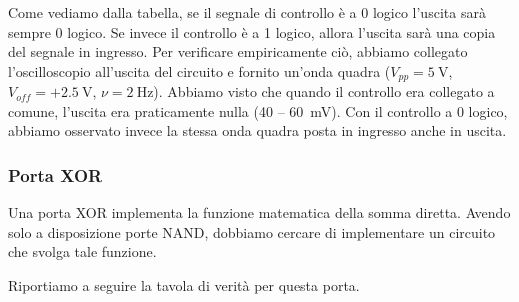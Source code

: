 Come vediamo dalla tabella, se il segnale di controllo è a 0 logico l'uscita sarà sempre 0 logico.
Se invece il controllo è a 1 logico, allora l'uscita sarà una copia del segnale in ingresso.
Per verificare empiricamente ciò, abbiamo collegato l'oscilloscopio all'uscita del circuito e fornito un'onda quadra ($V_{pp}=\SI{5}{\volt}$, $V_{off}=+\SI{2.5}{\volt}$, $\nu=\SI{2}{\hertz}$).
Abbiamo visto che quando il controllo era collegato a comune, l'uscita era praticamente nulla (\num{40} -- \SI{60}{\mV}).
Con il controllo a 0 logico, abbiamo osservato invece la stessa onda quadra posta in ingresso anche in uscita.

\subsubsection{Porta XOR}


Una porta XOR implementa la funzione matematica della somma diretta.
Avendo solo a disposizione porte NAND, dobbiamo cercare di implementare un circuito che svolga tale funzione.

Riportiamo a seguire la tavola di verità per questa porta.

